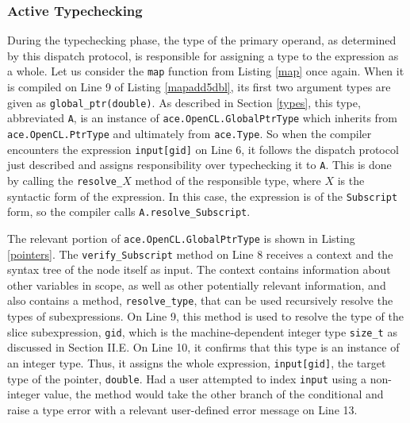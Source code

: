 \documentclass{sig-alternate}
\begin{document}
\subsubsection{Active Typechecking}
During the typechecking phase, the type of the primary operand, as determined by this dispatch protocol, is responsible for assigning a type to the expression as a whole. Let us consider the \verb|map| function from Listing \ref{map} once again. When it is compiled on Line 9 of Listing \ref{mapadd5dbl}, its first two argument types are given as \verb|global_ptr(double)|. As described in Section \ref{types}, this type, abbreviated \verb|A|, is an instance of \verb|ace.OpenCL.GlobalPtrType| which inherits from \verb|ace.OpenCL.PtrType| and ultimately from \verb|ace.Type|. So when the compiler encounters the expression \verb|input[gid]| on Line 6, it follows the dispatch protocol just described and assigns responsibility over typechecking it to \verb|A|. This is done by calling the \verb|resolve_|$X$ method of the responsible type, where $X$ is the syntactic form of the expression. In this case, the expression is of the \verb|Subscript| form, so the compiler calls \verb|A.resolve_Subscript|.

The relevant portion of \verb|ace.OpenCL.GlobalPtrType| is shown in Listing \ref{pointers}. The \verb|verify_Subscript| method on Line 8 receives a context and the syntax tree of the node itself as input. The context contains information about other variables in scope, as well as other potentially relevant information, and also contains a method, \verb|resolve_type|, that can be used recursively resolve the types of subexpressions. On Line 9, this method is used to resolve the type of the slice subexpression, \verb|gid|, which is the machine-dependent integer type \verb|size_t| as discussed in Section II.E. On Line 10, it confirms that this type is an instance of an integer type. Thus, it assigns the whole expression, \verb|input[gid]|, the target type of the pointer, \verb|double|. Had a user attempted to index \verb|input| using a non-integer value, the method would take the other branch of the conditional and raise a type error with a relevant user-defined error message on Line 13.
\end{document}
